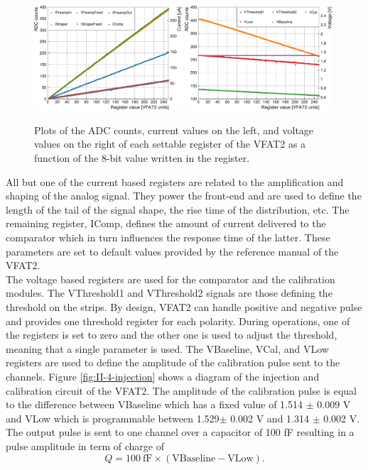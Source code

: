       \begin{figure}[h!]
        \centering
        \includegraphics[width=0.49\textwidth]{img/plots/cADC_Current-crop}
        \includegraphics[width=0.49\textwidth]{img/plots/cADC_Voltage-crop}
        \caption{Plots of the ADC counts, current values on the left, and voltage values on the right of each settable register of the VFAT2 as a function of the 8-bit value written in the register.}
        \label{fig:II-4-adc}
      \end{figure}

      All but one of the current based registers are related to the amplification and shaping of the analog signal. They power the front-end and are used to define the length of the tail of the signal shape, the rise time of the distribution, etc. The remaining register, IComp, defines the amount of current delivered to the comparator which in turn influences the response time of the latter. These parameters are set to default values provided by the reference manual of the VFAT2. \\

      The voltage based registers are used for the comparator and the calibration modules. The VThreshold1 and VThreshold2 signals are those defining the threshold on the strips. By design, VFAT2 can handle positive and negative pulse and provides one threshold register for each polarity. During operations, one of the registers is set to zero and the other one is used to adjust the threshold, meaning that a single parameter is used. The VBaseline, VCal, and VLow registers are used to define the amplitude of the calibration pulse sent to the channels. Figure \ref{fig:II-4-injection} shows a diagram of the injection and calibration circuit of the VFAT2. The amplitude of the calibration pulse is equal to the difference between VBaseline which has a fixed value of 1.514 $\pm$ 0.009 V and VLow which is programmable between 1.529$\pm$ 0.002 V and 1.314 $\pm$ 0.002 V. The output pulse is sent to one channel over a capacitor of 100 fF resulting in a pulse amplitude in term of charge of
      \begin{equation}
        \label{eq:II-4-injection}
        Q = 100 \ \text{fF} \times \left(\text{VBaseline} - \text{VLow} \right) .
      \end{equation}

